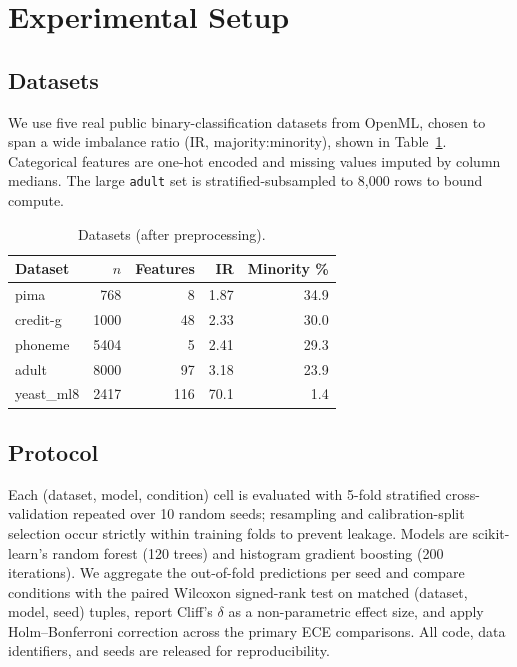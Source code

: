 \documentclass[conference]{IEEEtran}
\begin{document}
\section{Experimental Setup}
\subsection{Datasets}
We use five real public binary-classification datasets from OpenML,
chosen to span a wide imbalance ratio (IR, majority:minority), shown in
Table~\ref{tab:data}. Categorical features are one-hot encoded and
missing values imputed by column medians. The large \texttt{adult} set is
stratified-subsampled to 8{,}000 rows to bound compute.

\begin{table}[t]
\caption{Datasets (after preprocessing).}
\label{tab:data}
\centering
\begin{tabular}{lrrrr}
\toprule
Dataset & $n$ & Features & IR & Minority \% \\
\midrule
pima & 768 & 8 & 1.87 & 34.9 \\
credit-g & 1000 & 48 & 2.33 & 30.0 \\
phoneme & 5404 & 5 & 2.41 & 29.3 \\
adult & 8000 & 97 & 3.18 & 23.9 \\
yeast\_ml8 & 2417 & 116 & 70.1 & 1.4 \\
\bottomrule
\end{tabular}
\end{table}

\subsection{Protocol}
Each (dataset, model, condition) cell is evaluated with 5-fold stratified
cross-validation repeated over 10 random seeds; resampling and
calibration-split selection occur strictly within training folds to
prevent leakage. Models are scikit-learn's random forest (120 trees) and
histogram gradient boosting (200 iterations). We aggregate the
out-of-fold predictions per seed and compare conditions with the paired
Wilcoxon signed-rank test on matched (dataset, model, seed) tuples,
report Cliff's $\delta$ as a non-parametric effect size, and apply
Holm--Bonferroni correction across the primary ECE comparisons. All code,
data identifiers, and seeds are released for reproducibility.
\end{document}
